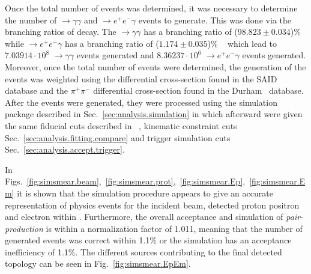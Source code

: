 	Once the total number of \pizT events was determined, it was necessary to determine the number of \pizT$\to \gamma \gamma$ and \pizT $\to e^+e^- \gamma$ events to generate. This was done via the branching ratios of \pizT decay. The \pizT $\to \gamma \gamma$ has a branching ratio of ($98.823 \pm 0.034$)\% while \pizT$\to e^+e^- \gamma$ has a branching ratio of ($1.174 \pm 0.035$)\% ~\cite{pdg2014} which lead to $7.03914 \cdot10^8$ \pizT $\to \gamma \gamma$ events generated and $8.36237 \cdot10^6$ \pizT$\to e^+e^- \gamma$ events generated. Moreover, once the total number of events were determined, the generation of the events was weighted using the \pizT differential cross-section found in the SAID~\cite{SAID} database and the $\pi^+\pi^-$ differential cross-section found in the Durham~\cite{durham} database. After the events were generated, they were processed using the simulation package described in Sec.~\ref{sec:analysis.simulation} in which afterward were given the same fiducial cuts described in ~\cite{g12note}, kinematic constraint cuts Sec.~\ref{sec:analysis.fitting.compare} and trigger simulation cuts Sec.~\ref{sec:analysis.accept.trigger}. 
	
	In Figs.~\ref{fig:simsmear.beam},~\ref{fig:simsmear.prot},~\ref{fig:simsmear.Ep},~\ref{fig:simsmear.Em} it is shown that the simulation procedure appears to give an accurate representation of physics events for the incident beam, detected proton positron and electron within . Furthermore, the overall acceptance and simulation of \emph{pair-production} is within a normalization factor of 1.011, meaning that the number of generated events was correct within 1.1\% or the simulation has an acceptance inefficiency of 1.1\%. The different sources contributing to the final detected \epemT topology can be seen in Fig.~\ref{fig:simsmear.EpEm}. 
	
